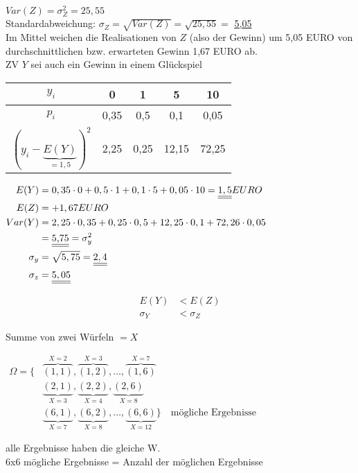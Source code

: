 $Var(Z) = \sigma_Z^2 = 25,55$\\
Standardabweichung: $\sigma_Z = \sqrt{Var(Z)} = \sqrt{25,55} = $ \underline{\underline{5,05}} \\

Im Mittel weichen die Realisationen von $Z$ (also der Gewinn) um 5,05 EURO von durchschnittlichen bzw. erwarteten Gewinn 1,67 EURO ab.\\

ZV $Y$ sei auch ein Gewinn in einem Glückspiel

\begin{tabular}{c | c c c c}
	$y_i$		&		0		&		1		&		5		&		10	\\
	\hline
	$p_i$		&	0,35	& 0,5		&		0,1	&	0,05  \\
	$(y_i -\underbrace{E(Y)}_{= 1,5})^2$
					&	2,25	&	0,25	&	12,15	&	72,25
\end{tabular}

$\begin{aligned}
	E(Y) &= 0,35 \cdot 0 + 0,5 \cdot 1 + 0,1 \cdot 5 + 0,05 \cdot 10 =
	\underline{\underline{1,5}} EURO \\
%
	E(Z) &= +1,67  EURO \\
%
	Var(Y) &= 2,25 \cdot 0,35 + 0,25 \cdot 0,5 + 12,25 \cdot 0,1 +
	72,26 \cdot 0,05 \\
	&= \text{\underline{\underline{5,75}}} = \sigma_y^2\\
%
	\sigma_y &= \sqrt{5,75} = \underline{\underline{2,4}} \\
%
	\sigma_z &= \underline{\underline{5,05}} \\
\end{aligned}$

$$\begin{aligned}
	E(Y)		 &<	E(Z) \\
	\sigma_Y &< \sigma_Z
\end{aligned}$$

Summe von zwei Würfeln $ = X$

$\begin{aligned}
\Omega = \{& \overbrace{(1,1)}^{X=2}, \overbrace{(1,2)}^{X=3}, \dots , 
	\overbrace{(1,6)}^{X=7} \\
					 & \underbrace{(2,1)}_{X=3}, \underbrace{(2,2)}_{X=4}, 
	\underbrace{(2,6)}_{X=8} \\
	 				 & \underbrace{(6,1)}_{X=7}, \underbrace{(6,2)}_{X=8}, \dots ,
	\underbrace{(6,6)}_{X=12}\} \quad \text{mögliche Ergebnisse}
\end{aligned}$
\par
alle Ergebnisse haben die gleiche W. \\
6x6 mögliche Ergebnisse = Anzahl der möglichen Ergebnisse

